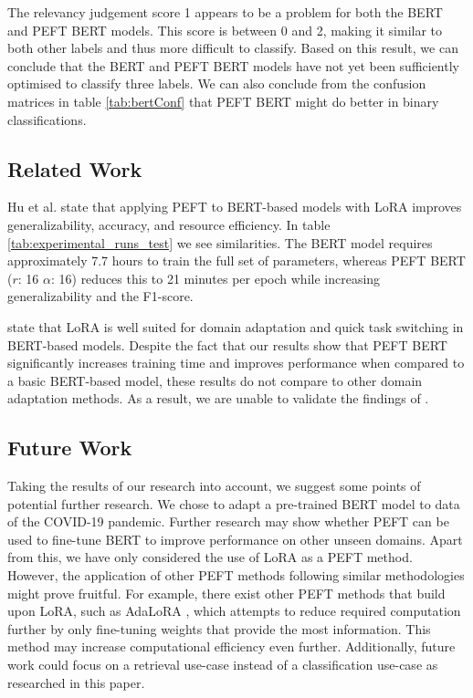 \documentclass[sigconf, natbib=true]{acmart}
\begin{document}
The relevancy judgement score 1 appears to be a problem for both the BERT and PEFT BERT models. 
This score is between 0 and 2, making it similar to both other labels and thus more difficult to classify. 
Based on this result, we can conclude that the BERT and PEFT BERT models have not yet been sufficiently optimised to classify three labels. 
We can also conclude from the confusion matrices in table \ref{tab:bertConf} that PEFT BERT might do better in binary classifications.  

\subsection{Related Work} 
Hu et al.\cite{hu2022lora} state that applying PEFT to BERT-based models with LoRA improves generalizability, accuracy, and resource efficiency. 
In table \ref{tab:experimental_runs_test} we see similarities. The BERT model requires approximately 7.7 hours to train the full set of parameters, whereas PEFT BERT ($r$: 16 $\alpha$: 16) reduces this to 21 minutes per epoch while increasing generalizability and the F1-score. 

\citeauthor{pfeiffer2020} \cite{pfeiffer2020} state that LoRA is well suited for domain adaptation and quick task switching in BERT-based models. 
Despite the fact that our results show that PEFT BERT significantly increases training time and improves performance when compared to a basic BERT-based model, these results do not compare to other domain adaptation methods. 
As a result, we are unable to validate the findings of \citeauthor{pfeiffer2020}. 

\subsection{Future Work}
Taking the results of our research into account, we suggest some points of potential further research.
We chose to adapt a pre-trained BERT model to data of the COVID-19 pandemic.
Further research may show whether PEFT can be used to fine-tune BERT to improve performance on other unseen domains.
Apart from this, we have only considered the use of LoRA as a PEFT method.
However, the application of other PEFT methods following similar methodologies might prove fruitful.
For example, there exist other PEFT methods that build upon LoRA, such as AdaLoRA \cite{zhang2023adaptive}, which attempts to reduce required computation further by only fine-tuning weights that provide the most information. This method may increase computational efficiency even further. 
Additionally, future work could focus on a retrieval use-case instead of a classification use-case as researched in this paper.
\end{document}
